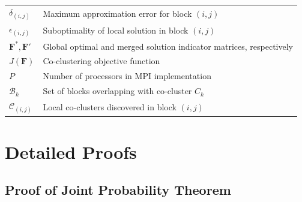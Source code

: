 \documentclass[journal]{IEEEtran}
\theoremstyle{definition}
\theoremstyle{remark} %
\begin{document}
\begin{table}[htbp]
\begin{tabular}{@{} p{} p{} @{}}
        $\delta_{(i,j)}$                   & Maximum approximation error for block $(i,j)$                                                 \\
        $\epsilon_{(i,j)}$                 & Suboptimality of local solution in block $(i,j)$                                              \\
        $\mathbf{F}^*, \mathbf{F}'$        & Global optimal and merged solution indicator matrices, respectively                           \\
        $J(\mathbf{F})$                    & Co-clustering objective function                                                              \\
        $P$                                & Number of processors in MPI implementation                                                    \\
        $\mathcal{B}_k$                    & Set of blocks overlapping with co-cluster $C_k$                                               \\
        $\mathcal{C}_{(i,j)}$              & Local co-clusters discovered in block $(i,j)$                                                 \\
        \bottomrule
    \end{tabular}
\end{table}

\section{Detailed Proofs}
\label{appendix:proofs}

\subsection{Proof of Joint Probability Theorem}
\label{appendix:proof-joint-probability}
\end{document}
